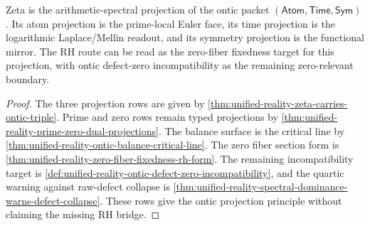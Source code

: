 \begin{theorem}
\label{thm:unified-reality-zeta-ontic-projection-principle}
Zeta is the arithmetic-spectral projection of the ontic packet
$(\mathsf{Atom},\mathsf{Time},\mathsf{Sym})$. Its atom projection is the
prime-local Euler face, its time projection is the logarithmic
Laplace/Mellin readout, and its symmetry projection is the functional
mirror. The RH route can be read as the zero-fiber fixedness target for
this projection, with ontic defect-zero incompatibility as the remaining
zero-relevant boundary.
\end{theorem}

\begin{proof}
The three projection rows are given by
\autoref{thm:unified-reality-zeta-carries-ontic-triple}. Prime and zero
rows remain typed projections by
\autoref{thm:unified-reality-prime-zero-dual-projections}. The balance
surface is the critical line by
\autoref{thm:unified-reality-ontic-balance-critical-line}. The zero
fiber section form is
\autoref{thm:unified-reality-zero-fiber-fixedness-rh-form}. The
remaining incompatibility target is
\autoref{def:unified-reality-ontic-defect-zero-incompatibility}, and
the quartic warning against raw-defect collapse is
\autoref{thm:unified-reality-spectral-dominance-warns-defect-collapse}.
These rows give the ontic projection principle without claiming the
missing RH bridge.
\end{proof}

